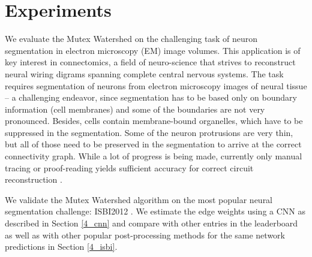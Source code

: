 
\section{Experiments} \label{4_results}

We evaluate the Mutex Watershed on the challenging task of 
neuron segmentation in electron microscopy (EM) image volumes.
This application is of key interest in connectomics, a field of 
neuro-science that strives to reconstruct neural wiring digrams spanning complete central nervous systems. The task requires segmentation of neurons from electron microscopy images of neural tissue -- a challenging endeavor, since segmentation has to be based only on boundary information (cell membranes) and some of the boundaries are not very pronounced. Besides, cells contain membrane-bound organelles, which have to be suppressed in the segmentation. Some of the neuron protrusions are very thin, but all of those need to be preserved in the segmentation to arrive at the correct connectivity graph. While a lot of progress is being made, currently only manual tracing or proof-reading yields sufficient accuracy for correct circuit reconstruction \cite{schlegel2017Learning}.

We validate the Mutex Watershed algorithm on the most popular neural segmentation challenge: ISBI2012 \cite{isbi2012challenge}. We estimate the edge weights using a CNN as described in Section \ref{4_cnn} and compare with other entries in the leaderboard as well as with other popular post-processing methods for the same network predictions in Section \ref{4_isbi}. 


